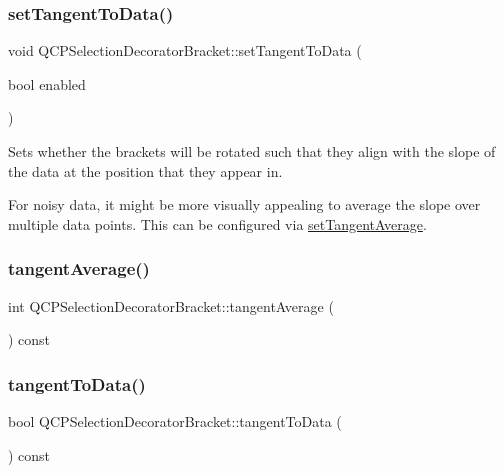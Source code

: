 \subsubsection{\texorpdfstring{set\+Tangent\+To\+Data()}{setTangentToData()}}
{\footnotesize\ttfamily void Q\+C\+P\+Selection\+Decorator\+Bracket\+::set\+Tangent\+To\+Data (\begin{DoxyParamCaption}\item[{bool}]{enabled }\end{DoxyParamCaption})}

Sets whether the brackets will be rotated such that they align with the slope of the data at the position that they appear in.

For noisy data, it might be more visually appealing to average the slope over multiple data points. This can be configured via \hyperlink{class_q_c_p_selection_decorator_bracket_adb2d0876f25a77c88042b70818f1d6e4}{set\+Tangent\+Average}. \mbox{\label{class_q_c_p_selection_decorator_bracket_a4e21ee2db0f43c1208d2e30879ec6a3c}} 
\subsubsection{\texorpdfstring{tangent\+Average()}{tangentAverage()}}
{\footnotesize\ttfamily int Q\+C\+P\+Selection\+Decorator\+Bracket\+::tangent\+Average (\begin{DoxyParamCaption}{ }\end{DoxyParamCaption}) const\hspace{0.3cm}{\ttfamily [inline]}}

\mbox{\label{class_q_c_p_selection_decorator_bracket_a257cb5f8b822edc839c1510ed0f23f13}} 
\subsubsection{\texorpdfstring{tangent\+To\+Data()}{tangentToData()}}
{\footnotesize\ttfamily bool Q\+C\+P\+Selection\+Decorator\+Bracket\+::tangent\+To\+Data (\begin{DoxyParamCaption}{ }\end{DoxyParamCaption}) const\hspace{0.3cm}{\ttfamily [inline]}}



